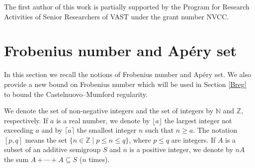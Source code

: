 \documentclass[11pt]{article}
\def\Zset{{\mathbb Z}}
\def\Nset{{\mathbb N}}
\theoremstyle{remark}
\theoremstyle{definition}
\begin{document}
The first author of this work is partially supported by  the Program for Research Activities of Senior Researchers of VAST under the grant number  NVCC. 

\section{Frobenius number and Ap\'ery set} \label{Apery}

In this section we recall the notions of Frobenius number and Ap\'ery set. We also provide a new bound on Frobenius number which will be used in Section \ref{Breg} to bound the Castelnuovo--Mumford regularity.

We denote the set of non-negative integers and the set of integers by $\Nset$ and $\Zset$, respectively. If $a$ is a real number, we denote by $\lfloor a \rfloor$ the largest integer not exceeding $a$ and by $\lceil a \rceil$ the smallest integer $n$ such that $n\geq a$. The notation $[p,q]$ means the set $ \{n\in \Zset\mid p\leq n\leq q\}$, where $p\leq q$ are integers. If $A$ is a subset of an additive  semigroup $S$ and  $n$ is a positive integer, we denote by $nA$ the sum $A+\cdots + A \subseteq S$ ($n$ times).
\end{document}
